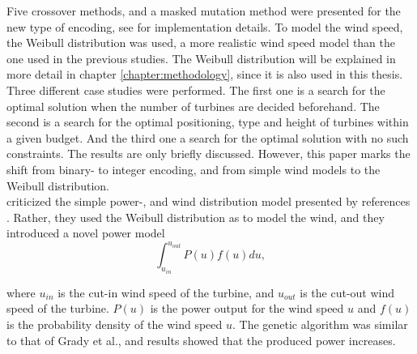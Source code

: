 \noindent Five crossover methods, and a masked mutation method were presented for the new type of encoding, see \cite{Mora} for implementation details. To model the wind speed, the Weibull distribution was used, a more realistic wind speed model than the one used in the previous studies. The Weibull distribution will be explained in more detail in chapter \ref{chapter:methodology}, since it is also used in this thesis. Three different case studies were performed. The first one is a search for the optimal solution when the number of turbines are decided beforehand. The second is a search for the optimal positioning, type and height of turbines within a given budget. And the third one a search for the optimal solution with no such constraints. The results are only briefly discussed. However, this paper marks the shift from binary- to integer encoding, and from simple wind models to the Weibull distribution.\\


\noindent \cite{Wan} criticized the simple power-, and wind distribution model presented by references \cite{Mosetti, Grady}. Rather, they used the Weibull distribution as \cite{Mora} to model the wind, and they introduced a novel power model \\


\begin{equation}
\label{Power Model (Wan)}
\int_{u_{in}}^{u_{out}} P(u)f(u) du,
\end{equation}


\noindent where $u_{in}$ is the cut-in wind speed of the turbine, and $u_{out}$ is the cut-out wind speed of the turbine. $P(u)$ is the power output for the wind speed $u$ and $f(u)$ is the probability density of the wind speed $u$. The genetic algorithm was similar to that of Grady et al., and results showed that the produced power increases.\\


